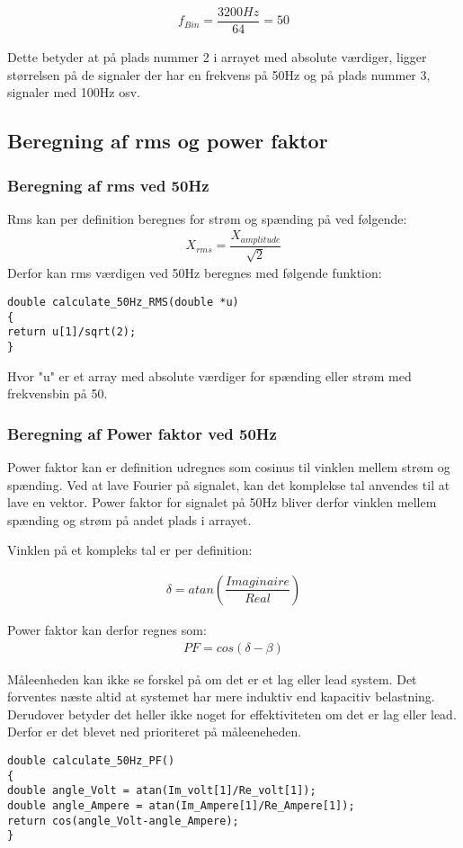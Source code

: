\begin{align}
f_{Bin} = \dfrac{3200Hz}{64} = 50
\end{align}

Dette betyder at på plads nummer 2 i arrayet med absolute værdiger, ligger størrelsen på de signaler der har en frekvens på 50Hz og på plads nummer 3, signaler med 100Hz osv.

\subsection{Beregning af rms og power faktor}

\subsubsection{Beregning af rms ved 50Hz}
Rms kan per definition beregnes for strøm og spænding på ved følgende: 
\begin{align}
 X_{rms}= \dfrac{X_{amplitude}}{\sqrt{2}}
\end{align}
Derfor kan rms værdigen ved 50Hz beregnes med følgende funktion:
\begin{lstlisting}
double calculate_50Hz_RMS(double *u)
{
return u[1]/sqrt(2);  
}
\end{lstlisting}

Hvor "u" er et array med absolute værdiger for spænding eller strøm med frekvensbin på 50.

\subsubsection{Beregning af Power faktor ved 50Hz}

Power faktor kan er definition udregnes som cosinus til vinklen mellem strøm og spænding. Ved at lave Fourier på signalet, kan det komplekse tal anvendes til at lave en vektor. Power faktor for signalet på 50Hz bliver derfor vinklen mellem spænding og strøm på andet plads i arrayet.

Vinklen på et kompleks tal er per definition:

\begin{align}
\delta = atan(\dfrac{Imaginaire}{Real})
\end{align}

Power faktor kan derfor regnes som:
\begin{align}
PF = cos(\delta - \beta)
\end{align}

Måleenheden kan ikke se forskel på om det er et lag eller lead system. Det forventes næste altid at systemet har mere induktiv end kapacitiv belastning. Derudover betyder det heller ikke noget for effektiviteten om det er lag eller lead. Derfor er det blevet ned prioriteret på måleeneheden.

\begin{lstlisting}
double calculate_50Hz_PF()
{
double angle_Volt = atan(Im_volt[1]/Re_volt[1]);
double angle_Ampere = atan(Im_Ampere[1]/Re_Ampere[1]);    
return cos(angle_Volt-angle_Ampere);
}
\end{lstlisting}
 
    

  
